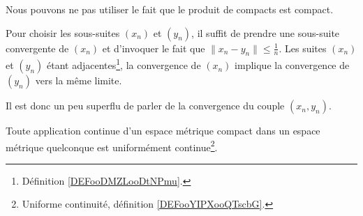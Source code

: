 \begin{remark}
	Nous pouvons ne pas utiliser le fait que le produit de compacts est compact.

	Pour choisir les sous-suites \( (x_n)\) et \( (y_n)\), il suffit de prendre une sous-suite convergente de \( (x_n)\) et d'invoquer le fait que \( \| x_n-y_n \|\leq \frac{1}{ n }\). Les suites \( (x_n)\) et \( (y_n)\) étant adjacentes\footnote{Définition \ref{DEFooDMZLooDtNPmu}.}, la convergence de \( (x_n)\) implique la convergence de \( (y_n)\) vers la même limite.

	Il est donc un peu superflu de parler de la convergence du couple \( (x_n,y_n)\).
\end{remark}

\begin{proposition}     \label{PROPooBWUFooYhMlDp}
	Toute application continue d'un espace métrique compact dans un espace métrique quelconque est uniformément continue\footnote{Uniforme continuité, définition \ref{DEFooYIPXooQTscbG}.}.
\end{proposition}

